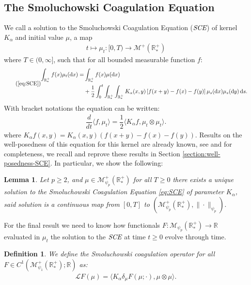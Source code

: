 \documentclass[11pt,a4paper]{article}
\newcommand{\RR}{\mathbb{R}}
\newcommand{\RRP}{\mathbb{R}^+_*}
\newcommand{\MC}{\mathcal{M}}
\newcommand{\LC}{\mathcal{L}}
\newcommand{\SCE}{\emph{SCE}}
\newcommand{\dd}{\mathop{}\!\mathrm{d}}
\newtheorem{lemma}[theorem]{Lemma}
\newtheorem{definition}[theorem]{Definition}
\begin{document}
\subsection{The Smoluchowski Coagulation Equation}
We call a solution to the Smoluchowski Coagulation Equation ($\SCE$) of kernel $K_\alpha$ and initial value $\mu$, a map
\begin{align*}
    t \mapsto \mu_t : [0,T) \to \MC^+(\RRP)
\end{align*}
where $T \in (0,\infty]$, such that for all bounded measurable function $f$:
\begin{equation}\tag{\ref{eq:SCE}}
\begin{aligned}
    \int_{\RRP} f(x)\mu_t (\dd x) =& \int_{\RRP} f(x)\mu (\dd x)\\
     &+ \dfrac12\int_0^t \int_{\RRP}\int_{\RRP} 
        K_{\alpha}(x,y)\left[f(x+y) - f(x) - f(y)\right] \mu_s(\dd x)\mu_s(\dd y) \dd s.
\end{aligned}
\end{equation}
With bracket notations the equation can be written:
\begin{align*}
    \dfrac{d}{dt}\langle f,\mu_t \rangle = \dfrac12\langle K_\alpha f , \mu_t \otimes \mu_t\rangle.
\end{align*}
where $K_\alpha f(x,y) = K_{\alpha}(x,y)\left(f(x+y) - f(x) - f(y) \right)$. Results on the well-posedness of this equation for this kernel are already known, see \cite{norrisSmoluchowskisCoagulationEquation1999} and for completeness, we recall and reprove these results in Section \ref{section:well-posedness-SCE}. In particular, we show the following:
\begin{lemma}\label{lem:well_posedness_smol_eq}
    Let $p \geq 2$, and $\mu \in \MC_{\psi_p}^+ (\RRP)$ for all $T \geq 0$ there exists a unique solution to the Smoluchowski Coagulation Equation \eqref{eq:SCE} of parameter $K_\alpha$, said solution is a continuous map from $[0,T]$ to $\left(\MC_{\psi_p}^+ (\RRP),\|\cdot\|_{\psi_p} \right)$.
\end{lemma}
For the final result we need to know how functionals $F : \MC_{\psi_p}(\RRP) \to \RR$ evaluated in $\mu_t$ the solution to the $\SCE$ at time $t \geq 0$ evolve through time.
\begin{definition}
    We define the Smoluchowski coagulation operator for all $F \in C^1(\MC^+_{\psi_1}\left(\RRP\right);\RR)$ as:
    \begin{align*}
        \LC F(\mu) = \langle K_\alpha \delta_\mu F(\mu;\cdot) , \mu\otimes \mu\rangle.
    \end{align*}
\end{definition}
\end{document}
